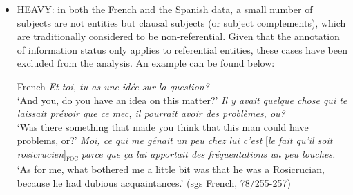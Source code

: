 \begin{itemize}
\ea \label{ex:5:79} Spanish
\ea \textit{Y, volviendo a las amistades mm del señor,} \textit{¿Eran?}\\
 `And, coming back to the acquaintances of the man, who were they?'
  \textit{	¿Frecuentaban mucho por aquí estas amistades que usted dice que tenía?}\\
 `Did they use to come over here, these acquaintances that you say that he had?'
\ex  \textit{Bueno, normalmente cambiaban.}\\    
`Well, they change continuously.'
  \textit{Pero en los últimos meses habían venido mucho} {[\textit{dos personas}]\textsubscript{\textsc{foc}}}\normalsize.\\
`But, lately, two people came more often.' \hfill (sgs Spanish, 2/277-280)        
\z \z

\ea \label{ex:5:80} French
\ea \textit{Il y a d'autres voisins qui sont rentrés ou sortis avant?}\\
 ‘Are there other people who entered or left the building before this moment?'
\ex \textit{Oui}.\\    
‘Yes.'
 \textit{Dites-moi qui, s'il-vous-plaît!}\\    
‘Tell me who, please!'
  \textit{Non, posez les questions.}\\    
‘No, ask me specific questions.'
 \textit{Donc, en fait, il y a}  {[\textit{une femme qui habite au dessus}]\textsubscript{\textsc{foc}}} \normalsize \textit{qui est rentrée aussi}.\\
`So, actually, there is a woman who lives upstairs who came back as well.' \hfill (sgs French, 10/332-336)     
\z \z 

\item {\selectfont HEAVY}: in both the French and the Spanish data, a small number of subjects are not entities but clausal subjects (or subject complements), which are traditionally considered to be non-referential. Given that the annotation of information status only applies to referential entities, these cases have been excluded from the analysis. An example can be found below:

\ea \label{ex:5:81} French
\ea \textit{Et toi, tu as une idée sur la question?}\\
 `And you, do you have an idea on this matter?'
  \textit{Il y avait quelque chose qui te laissait prévoir que ce mec, il pourrait avoir des problèmes, ou?} \\    
`Was there something that made you think that this man could have problems, or?'
\ex \textit{Moi, ce qui me génait un peu chez lui c'est} {[\textit{le fait qu'il soit rosicrucien}]\textsubscript{\textsc{foc}}} \normalsize \textit{parce que ça lui apportait des fréquentations un peu louches.}\\
`As for me, what bothered me a little bit was that he was a Rosicrucian, because he had dubious acquaintances.' \hfill (sgs French, 78/255-257)   
\z \z 
\end{itemize}


